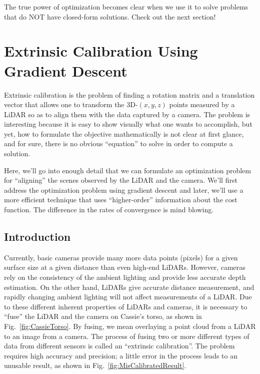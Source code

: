 \Qed


The true power of optimization becomes clear when we use it to solve problems that do NOT have closed-form solutions. Check out the next section! \\



\section{Extrinsic Calibration Using Gradient Descent}
\label{sec:ExtrinsicCalibration}
Extrinsic calibration is the problem of finding a rotation matrix and a translation vector that allows one to transform the 3D-$(x,y,z)$ points measured by a LiDAR so as to align them with the data captured by a camera. The problem is interesting because it is easy to show visually what one wants to accomplish, but yet, how to formulate the objective mathematically is not clear at first glance, and for sure, there is no obvious ``equation'' to solve in order to compute a solution. 

Here, we'll go into enough detail that we can formulate an optimization problem for ``aligning'' the scenes observed by the LiDAR and the camera. We'll first address the optimization problem using gradient descent and later, we'll use a more efficient technique that uses ``higher-order'' information about the cost function. The difference in the rates of convergence is mind blowing.

\subsection{Introduction}
\label{ex:ExtrinsicCalibrationUsingGradientDescent}
 Currently, basic cameras provide many more data points (pixels) for a given surface size at a given distance than even high-end LiDARs. However, cameras rely on the consistency of the ambient lighting and provide less accurate depth estimation. On the other hand, LiDARs give accurate distance measurement, and rapidly changing ambient lighting will not affect measurements of a LiDAR. Due to these different inherent properties of LiDARs and cameras, it is necessary to ``fuse'' the LiDAR and the camera on Cassie's torso, as shown in Fig.~\ref{fig:CassieTorso}. By fusing, we mean overlaying a point cloud from a LiDAR to an image from a camera. The process of fusing two or more different types of data from different sensors is called an ``extrinsic calibration''. The problem requires high accuracy and precision; a little error in the process leads to an unusable result, as shown in Fig.~\ref{fig:MisCalibratedResult}.


